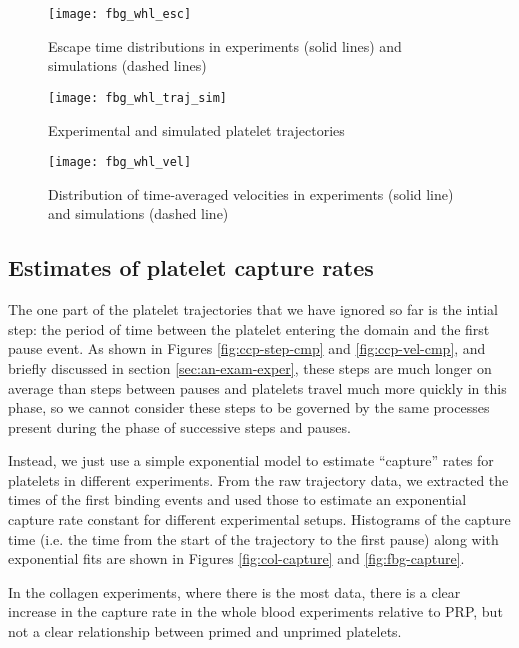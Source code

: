 \begin{figure}
  \centering
  \texttt{[image: fbg\_whl\_esc]}
  \caption{Escape time distributions in experiments (solid lines)
    and simulations (dashed lines)}
  \label{fig:fbg-whl-esc}
\end{figure}

\begin{figure}
  \centering
  \texttt{[image: fbg\_whl\_traj\_sim]}
  \caption{Experimental and simulated platelet trajectories}
  \label{fig:fbg-whl-traj-sim}
\end{figure}

\begin{figure}
  \centering
  \texttt{[image: fbg\_whl\_vel]}
  \caption{Distribution of time-averaged velocities in experiments
    (solid line) and simulations (dashed line)}
  \label{fig:fbg-whl-vel}
\end{figure}

\subsection{Estimates of platelet capture rates}
\label{sec:estim-plat-capt}

The one part of the platelet trajectories that we have ignored so far
is the intial step: the period of time between the platelet entering
the domain and the first pause event. As shown in Figures
\ref{fig:ccp-step-cmp} and \ref{fig:ccp-vel-cmp}, and briefly
discussed in section \ref{sec:an-exam-exper}, these steps are much
longer on average than steps between pauses and platelets travel much
more quickly in this phase, so we cannot consider these steps to be
governed by the same processes present during the phase of successive
steps and pauses.

Instead, we just use a simple exponential model to estimate
``capture'' rates for platelets in different experiments. From the raw
trajectory data, we extracted the times of the first binding events
and used those to estimate an exponential capture rate constant for
different experimental setups. Histograms of the capture time
(i.e. the time from the start of the trajectory to the first pause)
along with exponential fits are shown in Figures \ref{fig:col-capture}
and \ref{fig:fbg-capture}.

In the collagen experiments, where there is the most data, there is a
clear increase in the capture rate in the whole blood experiments
relative to PRP, but not a clear relationship between primed and
unprimed platelets.

